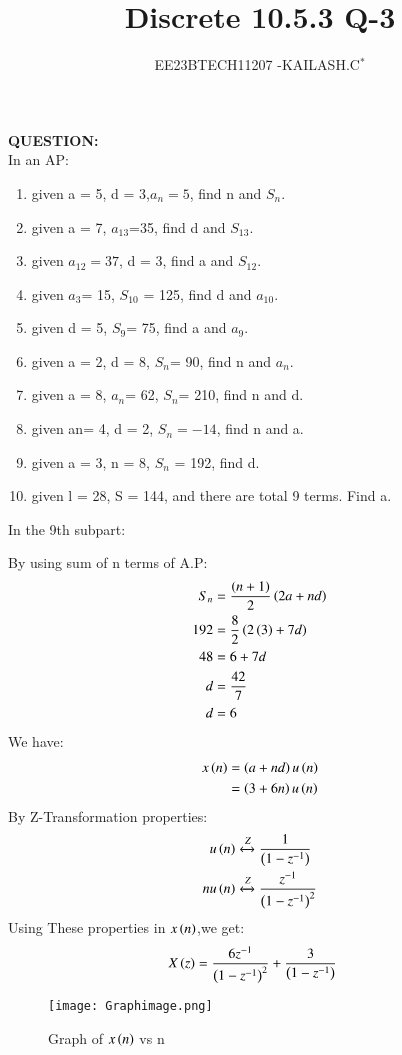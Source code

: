\documentclass[journal,12pt,twocolumn]{IEEEtran}
\theoremstyle{remark}
\begin{document}

\vspace{3cm}

\title{Discrete 10.5.3 Q-3}
\author{EE23BTECH11207 -KAILASH.C$^{*}$%
}
\maketitle
\newpage
\bigskip

\renewcommand{\thefigure}{\theenumi}
\renewcommand{\thetable}{\theenumi}

\textbf{QUESTION:}\\
In an AP:
\begin{enumerate}
\item given a = 5, d = 3,$a_n=5$, find n and $S_n$.
\item given a = 7, $a_{13}$=35, find d and $S_{13}$.
\item given $a_{12}=37$, d = 3, find a and $S_{12}$.
\item given $a_3$= 15, $S_{10}$ = 125, find d and $a_{10}$.
\item given d = 5, $S_9$= 75, find a and $a_9$.
\item given a = 2, d = 8, $S_n$= 90, find n and $a_n$.
\item given a = 8, $a_n$= 62, $S_n$= 210, find n and d.
\item given an= 4, d = 2, $S_n=-14$, find n and a.
\item given a = 3, n = 8, $S_n$ = 192, find d.
\item given l = 28, S = 144, and there are total 9 terms. Find a.
\end{enumerate}
\solution 
In the 9th subpart:

By using sum of n terms of A.P:
\begin{align}
S_n&=\frac{\left(n+1\right)}{2}\left(2a+nd\right)\label{eq:105331}\\
 192&=\frac{8}{2}\left(2\left(3\right)+7d\right)\label{eq:105332}\\
 48&=6+7d\label{eq:105533}\\
 d&=\frac{42}{7}\label{eq:105334}\\
 d&=6\label{eq:105335}
\end{align}
We have:
\begin{align}
    x\left(n\right)&=\left(a+nd\right)u\left(n\right)\label{eq:105336}\\
    &=\left(3+6n\right)u\left(n\right)\label{eq:105337}
\end{align}
By Z-Transformation properties:
\begin{align}
u\left(n\right)&\xleftrightarrow[]{Z} \frac{1}{\left(1-z^{-1}\right)}\label{eq:105338}\\
    nu\left(n\right)&\xleftrightarrow[]{Z} \frac{z^{-1}}{\left(1-z^{-1}\right)^2}\label{eq:105339}
\end{align}
Using These properties in $x\left(n\right)$,we get:
\begin{align}
    X\left(z\right)&=\frac{6z^{-1}}{\left(1-z^{-1}\right)^2}+\frac{3}{\left(1-z^{-1}\right)}\label{eq:1053310}
\end{align}
\begin{figure}[h]
        \centering
\texttt{[image: Graphimage.png]}
\caption{Graph of $x\left(n\right)$ vs n}
\label{fig:Fig10_5_3_3}
\end{figure}
\end{document}
